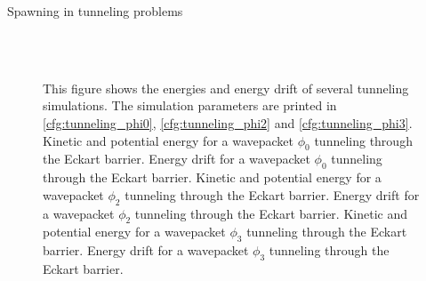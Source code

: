 \begin{chapter}{Spawning in tunneling problems}
\begin{figure}[h!]
{  } \\
   \\
  \caption[Energies and energy drift for some tunneling wavepackets]{
  This figure shows the energies and energy drift of several tunneling simulations.
  The simulation parameters are printed in \ref{cfg:tunneling_phi0}, \ref{cfg:tunneling_phi2} and \ref{cfg:tunneling_phi3}.
   Kinetic and potential energy for a wavepacket $\phi_0$ tunneling through the Eckart barrier.
   Energy drift for a wavepacket $\phi_0$ tunneling through the Eckart barrier.
   Kinetic and potential energy for a wavepacket $\phi_2$ tunneling through the Eckart barrier.
   Energy drift for a wavepacket $\phi_2$ tunneling through the Eckart barrier.
   Kinetic and potential energy for a wavepacket $\phi_3$ tunneling through the Eckart barrier.
   Energy drift for a wavepacket $\phi_3$ tunneling through the Eckart barrier.
  \label{fig:tunnel_energies}
  }
\end{figure}


\end{chapter}
